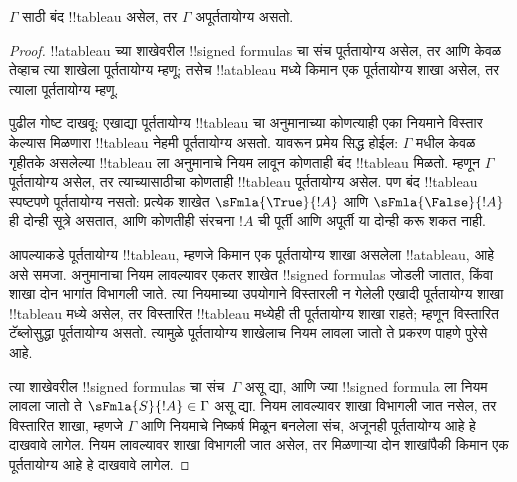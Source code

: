 \documentclass[../../../include/open-logic-section]{subfiles}
\begin{document}
\begin{thm}[निर्दोषता]
  $\Gamma$ साठी बंद !!{tableau} असेल, तर $\Gamma$ अपूर्ततायोग्य असतो.
\end{thm}

\begin{proof}
!!a{tableau} च्या शाखेवरील !!{signed formula}s चा संच पूर्ततायोग्य असेल, तर
आणि केवळ तेव्हाच त्या शाखेला पूर्ततायोग्य म्हणू; तसेच !!a{tableau} मध्ये
किमान एक पूर्ततायोग्य शाखा असेल, तर त्याला पूर्ततायोग्य म्हणू.

पुढील गोष्ट दाखवू: एखाद्या पूर्ततायोग्य !!{tableau} चा अनुमानाच्या कोणत्याही
एका नियमाने विस्तार केल्यास मिळणारा !!{tableau} नेहमी पूर्ततायोग्य असतो.
यावरून प्रमेय सिद्ध होईल: $\Gamma$ मधील केवळ गृहीतके असलेल्या !!{tableau} ला
अनुमानाचे नियम लावून कोणताही बंद !!{tableau} मिळतो. म्हणून $\Gamma$
पूर्ततायोग्य असेल, तर त्याच्यासाठीचा कोणताही !!{tableau} पूर्ततायोग्य असेल.
पण बंद !!{tableau} स्पष्टपणे पूर्ततायोग्य नसतो: प्रत्येक शाखेत
$\sFmla{\True}{!A}$ आणि $\sFmla{\False}{!A}$ ही दोन्ही सूत्रे असतात, आणि
कोणतीही संरचना $!A$ ची पूर्ती आणि अपूर्ती या दोन्ही करू शकत नाही.

आपल्याकडे पूर्ततायोग्य !!{tableau}, म्हणजे किमान एक पूर्ततायोग्य शाखा असलेला
!!a{tableau}, आहे असे समजा. अनुमानाचा नियम लावल्यावर एकतर शाखेत
!!{signed formula}s जोडली जातात, किंवा शाखा दोन भागांत विभागली जाते. त्या
नियमाच्या उपयोगाने विस्तारली न गेलेली एखादी पूर्ततायोग्य शाखा !!{tableau} मध्ये
असेल, तर विस्तारित !!{tableau} मध्येही ती पूर्ततायोग्य शाखा राहते; म्हणून
विस्तारित टॅब्लोसुद्धा पूर्ततायोग्य असतो. त्यामुळे पूर्ततायोग्य शाखेलाच नियम
लावला जातो ते प्रकरण पाहणे पुरेसे आहे.

त्या शाखेवरील !!{signed formula}s चा संच~$\Gamma$ असू द्या, आणि ज्या
!!{signed formula} ला नियम लावला जातो ते $\sFmla{S}{!A} \in \Gamma$ असू
द्या. नियम लावल्यावर शाखा विभागली जात नसेल, तर विस्तारित शाखा, म्हणजे
$\Gamma$ आणि नियमाचे निष्कर्ष मिळून बनलेला संच, अजूनही पूर्ततायोग्य आहे हे
दाखवावे लागेल. नियम लावल्यावर शाखा विभागली जात असेल, तर मिळणाऱ्या दोन
शाखांपैकी किमान एक पूर्ततायोग्य आहे हे दाखवावे लागेल.
  

\end{proof}
\end{document}
